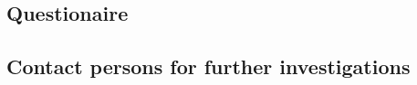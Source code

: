 \documentclass[pdftex,a4paper,10pt]{article}
\begin{document}
\cleardoublepage
{}
{}


\newpage

\begin{appendices}
	\subsection{Questionaire}
	
	\newpage
	\subsection{Contact persons for further investigations}
	\newpage
\end{appendices}
\end{document}
